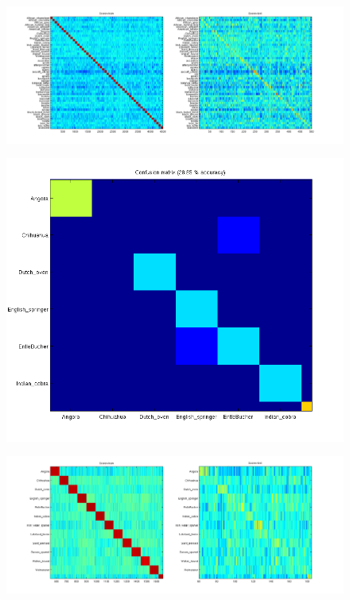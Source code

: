 \documentclass[10pt,two column,letter paper]{article}
\begin{document}
\begin{figure}[t]
\begin{center}
\includegraphics[width=0.9\linewidth]{m14-2_imagenet_tiny.png}
\end{center}
   \caption{}
\label{fig:m14-2_imagenet_tiny}
\end{figure}

\begin{figure}[t]
\begin{center}
\includegraphics[width=0.9\linewidth]{m2_imagenet_tiny_chihuahua-1.png}
\end{center}
   \caption{}
\label{fig:m2_imagenet_tiny_chihuahua_1}
\end{figure}

\begin{figure}[t]
\begin{center}
\includegraphics[width=0.9\linewidth]{m2_imagenet_tiny_chihuahua-2.png}
\end{center}
   \caption{}
\label{fig:m2_imagenet_tiny_chihuahua_2}
\end{figure}
\end{document}
